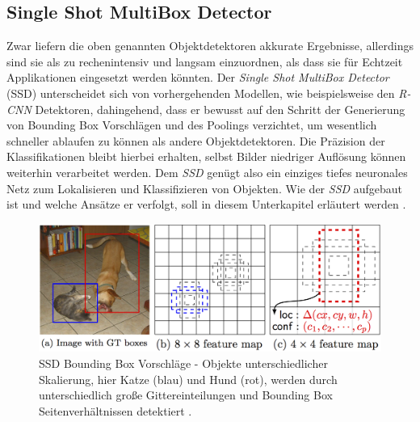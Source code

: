 \subsection*{Single Shot MultiBox Detector}

Zwar liefern die oben genannten Objektdetektoren akkurate Ergebnisse, allerdings sind sie als zu rechenintensiv und langsam einzuordnen, als dass sie für Echtzeit Applikationen eingesetzt werden könnten. Der \textit{Single Shot MultiBox Detector} (SSD) unterscheidet sich von vorhergehenden Modellen, wie beispielsweise den \textit{R-CNN} Detektoren, dahingehend, dass er bewusst auf den Schritt der Generierung von Bounding Box Vorschlägen und des Poolings verzichtet, um wesentlich schneller ablaufen zu können als andere Objektdetektoren. Die Präzision der Klassifikationen bleibt hierbei erhalten, selbst Bilder niedriger Auflösung können weiterhin verarbeitet werden. Dem \textit{SSD} genügt also ein einziges tiefes neuronales Netz zum Lokalisieren und Klassifizieren von Objekten. Wie der \textit{SSD} aufgebaut ist und welche Ansätze er verfolgt, soll in diesem Unterkapitel erläutert werden \cite{ssd.20161229}. 

\begin{figure}[H]
	\begin{center}
		\includegraphics[width=15cm]{Bilder/ssd_framework.png} 
		\caption[SSD Bounding Box Vorschläge]{SSD Bounding Box Vorschläge - Objekte unterschiedlicher Skalierung, hier Katze (blau) und Hund (rot), werden durch unterschiedlich große Gittereinteilungen und Bounding Box Seitenverhältnissen detektiert \cite{ssd.20161229}.}
		\label{framework}
	\end{center}
\end{figure}

